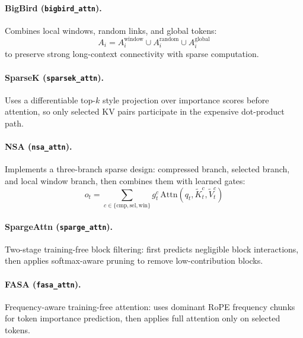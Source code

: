 \documentclass[11pt,a4paper]{article}
\begin{document}
\paragraph{BigBird (\texttt{bigbird\_attn}).}
Combines local windows, random links, and global tokens:
\[
A_i=A_i^{\text{window}}\cup A_i^{\text{random}}\cup A_i^{\text{global}}
\]
to preserve strong long-context connectivity with sparse computation.
\citep{zaheer_bigbird_2020}

\paragraph{SparseK (\texttt{sparsek\_attn}).}
Uses a differentiable top-$k$ style projection over importance scores before attention, so only selected KV pairs participate in the expensive dot-product path.
\citep{lou_sparsek_2024}

\paragraph{NSA (\texttt{nsa\_attn}).}
Implements a three-branch sparse design: compressed branch, selected branch, and local window branch, then combines them with learned gates:
\[
o_t=\sum_{c\in\{\text{cmp},\text{sel},\text{win}\}} g_t^c\,\text{Attn}(q_t,\tilde K_t^c,\tilde V_t^c)
\]
\citep{yuan_nsa_2025}

\paragraph{SpargeAttn (\texttt{sparge\_attn}).}
Two-stage training-free block filtering: first predicts negligible block interactions, then applies softmax-aware pruning to remove low-contribution blocks.
\citep{zhang_spargeattn_2025}

\paragraph{FASA (\texttt{fasa\_attn}).}
Frequency-aware training-free attention: uses dominant RoPE frequency chunks for token importance prediction, then applies full attention only on selected tokens.
\citep{wang_fasa_2026}
\end{document}
